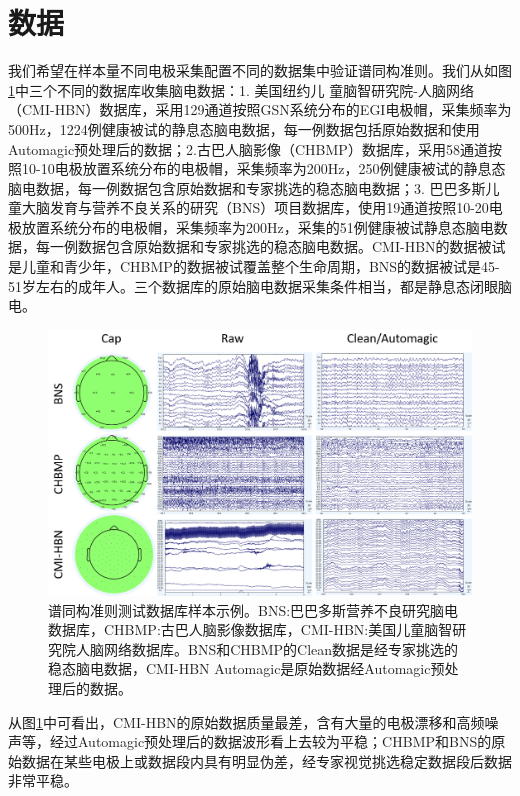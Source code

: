 \section{数据}
我们希望在样本量不同电极采集配置不同的数据集中验证谱同构准则。我们从如图\ref{5:database}中三个不同的数据库收集脑电数据：1. 美国纽约儿
童脑智研究院-人脑网络（CMI-HBN）数据库，采用129通道按照GSN系统分布的EGI电极帽，采集频率为500Hz，1224例健康被试的静息态脑电数据，每一例数据包括原始数据和使用Automagic预处理后的数据；2.古巴人脑影像（CHBMP）数据库，采用58通道按照10-10电极放置系统分布的电极帽，采集频率为200Hz，250例健康被试的静息态脑电数据，每一例数据包含原始数据和专家挑选的稳态脑电数据；3. 巴巴多斯儿童大脑发育与营养不良关系的研究（BNS）项目数据库，使用19通道按照10-20电极放置系统分布的电极帽，采集频率为200Hz，采集的51例健康被试静息态脑电数据，每一例数据包含原始数据和专家挑选的稳态脑电数据。CMI-HBN的数据被试是儿童和青少年，CHBMP的数据被试覆盖整个生命周期，BNS的数据被试是45-51岁左右的成年人。三个数据库的原始脑电数据采集条件相当，都是静息态闭眼脑电。
\begin{figure}[!h]
\includegraphics[width=15cm]{pic/palos/data.png}
\caption{谱同构准则测试数据库样本示例。BNS:巴巴多斯营养不良研究脑电数据库，CHBMP:古巴人脑影像数据库，CMI-HBN:美国儿童脑智研究院人脑网络数据库。BNS和CHBMP的Clean数据是经专家挑选的稳态脑电数据，CMI-HBN Automagic是原始数据经Automagic预处理后的数据。}
\label{5:database}
\end{figure}

从图\ref{5:database}中可看出，CMI-HBN的原始数据质量最差，含有大量的电极漂移和高频噪声等，经过Automagic预处理后的数据波形看上去较为平稳；CHBMP和BNS的原始数据在某些电极上或数据段内具有明显伪差，经专家视觉挑选稳定数据段后数据非常平稳。

